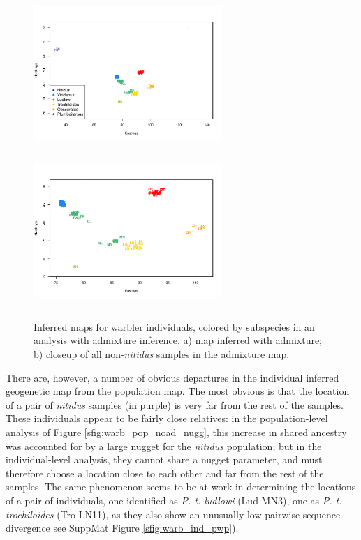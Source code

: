 \documentclass[12pt]{article}
\newcommand{\plr}[1]{{\it\color{purple}{(#1)}}}
\begin{document}
\begin{figure}
	\centering
			{\includegraphics[width=2.8in,height=2.3in]{figs/warblers/individual_warbler_map_arrows_randpr1.pdf}}
			{\includegraphics[width=2.8in,height=2.3in]{figs/warblers/individual_warbler_map_arrows_randpr1_closeup.pdf}}
	\caption{
    Inferred maps for warbler individuals, colored by subspecies in an analysis with admixture inference. 
    \plr{put legend for colors}
    a) map inferred with admixture; b) closeup of all non-\textit{nitidus} samples in the admixture map.
    \plr{labels are hard to read on the right.  This would be better put next to the sample map for comparison?}
}\label{sfig:warbler_ind_maps}
\end{figure}

There are, however, a number of obvious departures in the individual inferred geogenetic map from the population map.  The most obvious is that the location of a pair of \textit{nitidus} samples (in purple) is very far from the rest of the samples.  
These individuals appear to be fairly close relatives:
in the population-level analysis of Figure \ref{sfig:warb_pop_noad_nugg},
this increase in shared ancestry was accounted for by a large nugget for the \textit{nitidus} population;
but in the individual-level analysis, they cannot share a nugget parameter, 
and must therefore choose a location close to each other and far from the rest of the samples.
The same phenomenon seems to be at work in determining the locations of a pair of individuals, one identified as \textit{P. t. ludlowi} (Lud-MN3), one as \textit{P. t. trochiloides} (Tro-LN11), 
as they also show an unusually low pairwise sequence divergence see SuppMat Figure \ref{sfig:warb_ind_pwp}).
\end{document}
